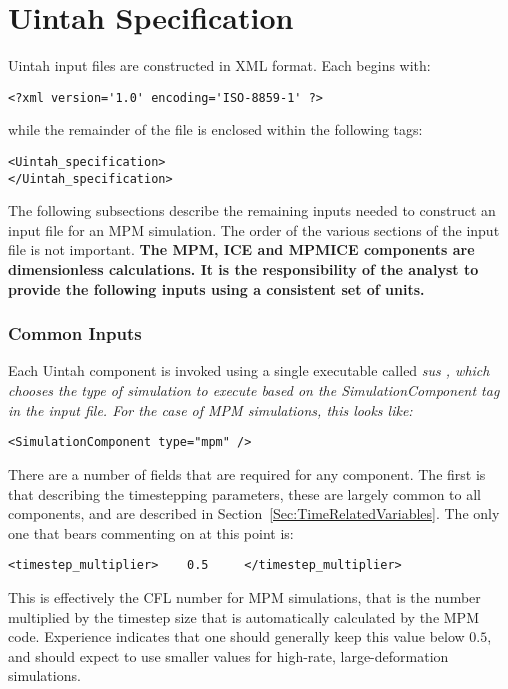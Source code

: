 \section{Uintah Specification} \label{Sec:UintahSpecMPM}

Uintah input files are constructed in XML format.  Each begins with:

\begin{Verbatim}[fontsize=\footnotesize]
<?xml version='1.0' encoding='ISO-8859-1' ?>
\end{Verbatim}
while the remainder of the file is enclosed within the following tags:
\begin{Verbatim}[fontsize=\footnotesize]
<Uintah_specification>
</Uintah_specification>
\end{Verbatim}

The following subsections describe the remaining inputs needed to construct
an input file for an MPM simulation.  The order of the various sections 
of the input file is not important.  {\bf The MPM, ICE and MPMICE components
are dimensionless calculations.  It is the responsibility of the analyst
to provide the following inputs using a consistent set of units.}

\subsubsection{Common Inputs}

Each Uintah component is invoked using a single executable called
\it sus \normalfont, which chooses the type of simulation
to execute based on the \it SimulationComponent \normalfont tag in the
input file.  For the case of MPM simulations, this looks like:

\begin{Verbatim}[fontsize=\footnotesize]
 <SimulationComponent type="mpm" />
\end{Verbatim}

There are a number of fields that are required for any component.  The first
is that describing the timestepping parameters, these are largely common to
all components, and are described in Section~\ref{Sec:TimeRelatedVariables}.
The only one that bears commenting on at this point is:

\begin{Verbatim}[fontsize=\footnotesize]
  <timestep_multiplier>    0.5     </timestep_multiplier>
\end{Verbatim}
This is effectively the CFL number for MPM simulations, that is the number
multiplied by the timestep size that is automatically calculated by the MPM
code.  Experience indicates that one should generally keep this value below
$0.5$, and should expect to use smaller values for high-rate, large-deformation
simulations.

